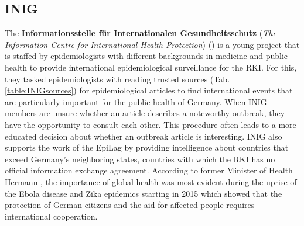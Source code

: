 \subsection{INIG}
  The \textbf{Informationsstelle für Internationalen Gesundheitsschutz} (\textit{The Information Centre for International Health Protection}) () is a young project that is staffed by epidemiologists with different backgrounds in medicine and public health to provide international epidemiological surveillance for the RKI.
  For this, they tasked epidemiologists with reading trusted sources (Tab. \ref{table:INIGsources}) for epidemiological articles to find international events that are particularly important for the public health of Germany.
  When INIG members are unsure whether an article describes a noteworthy outbreak, they have the opportunity to consult each other.
  This procedure often leads to a more educated decision about whether an outbreak article is interesting.
  INIG also supports the work of the EpiLag by providing intelligence about countries that exceed Germany's neighboring states, countries with which the RKI has no official information exchange agreement.
  According to former Minister of Health Hermann \citeauthor{Grohe2017}, the importance of global health was most evident during the uprise of the Ebola disease and Zika epidemics starting in 2015 which showed that the protection of German citizens and the aid for affected people requires international cooperation.


